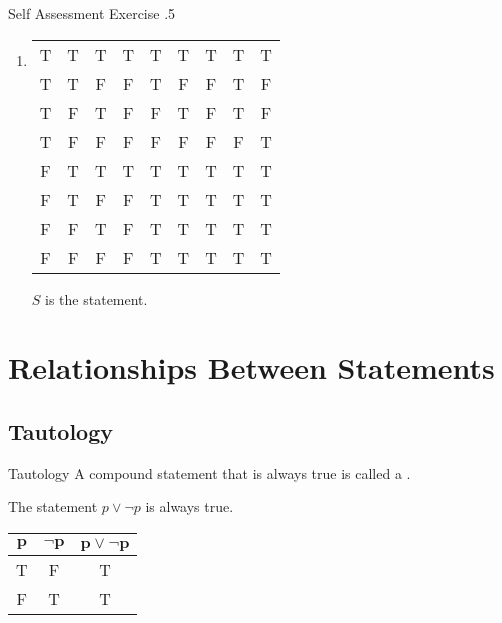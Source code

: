 \documentclass[../notes.tex]{subfiles}
\begin{document}
\begin{exercise}{Self Assessment Exercise \thechapter.5}
\begin{enumerate}
\begin{enumerate}
\begin{center}
\begin{tabular}{|c c c | c | c | c | c|}
										\hline
									\end{tabular}
								\end{center}
							\item {}
								\begin{center}
									\begin{tabular}{| c c c | c | c | c | c | c | c |}
										\hline
										\tablehead{$p$} & \tablehead{$q$} & \tablehead{$r$} & \tablehead{$q \land r$} & \tablehead{$p \rightarrow q$} & \tablehead{$p \rightarrow r$} & \tablehead{$p \rightarrow (q \land r)$} & \tablehead{$(p \rightarrow q) \lor (p \rightarrow r)$} & \tablehead{$S$}\\
										\hline
										T & T & T & T & T & T & T & T & T\\
										T & T & F & F & T & F & F & T & F\\
										T & F & T & F & F & T & F & T & F\\
										T & F & F & F & F & F & F & F & T\\
										F & T & T & T & T & T & T & T & T\\
										F & T & F & F & T & T & T & T & T\\
										F & F & T & F & T & T & T & T & T\\
										F & F & F & F & T & T & T & T & T\\
										\hline
									\end{tabular}
								\end{center}
								$S$ is the statement.
						\end{enumerate}
				\end{enumerate}
			\end{exercise}
			\pagebreak
		\section{Relationships Between Statements}
			\subsection{Tautology}
				\begin{definition}[width=0.7\textwidth]{Tautology}
					A compound statement that is always true is called a .
				\end{definition}
				\begin{example}[width=0.55\textwidth]
					The statement $p \lor \lnot p$ is always true.
					\begin{center}
						\begin{tabular}{| c c | c |}
							\hline
							$\mathbf{p}$ & $\mathbf{\lnot p}$ & $\mathbf{p \lor \lnot p}$\\
							\hline
							T & F & T\\
							F & T & T\\
							\hline
						\end{tabular}
					\end{center}
				\end{example}
\end{document}
